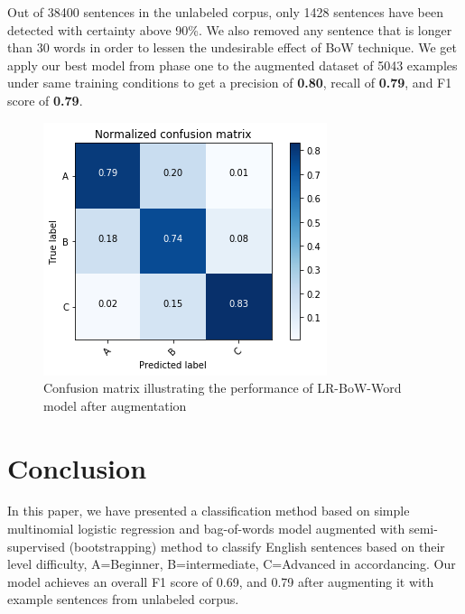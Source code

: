 Out of 38400 sentences in the unlabeled corpus, only 1428 sentences have been detected with certainty above 90\%. We also removed any sentence that is longer than 30 words in order to lessen the undesirable effect of BoW technique. We get apply our best model from phase one to the augmented dataset of 5043 examples under same training conditions to get a precision of \textbf{0.80}, recall of \textbf{0.79}, and F1 score of \textbf{0.79}. 

\begin{figure}[t]
	\centering
    \includegraphics[width=.75\linewidth]{../Figures/conf_matrix_iter2.png} 
	\caption{Confusion matrix illustrating the performance of LR-BoW-Word model after augmentation}
	\label{fig:cmdstudy}
\end{figure}

\section {Conclusion}
\label{sec:conclusion}
In this paper, we have presented a classification method based on simple multinomial logistic regression and bag-of-words model augmented with semi-supervised (bootstrapping) method to classify English sentences based on their level difficulty, A=Beginner, B=intermediate, C=Advanced in accordancing. Our model achieves an overall F1 score of 0.69, and 0.79 after augmenting it with example sentences from unlabeled corpus. 

